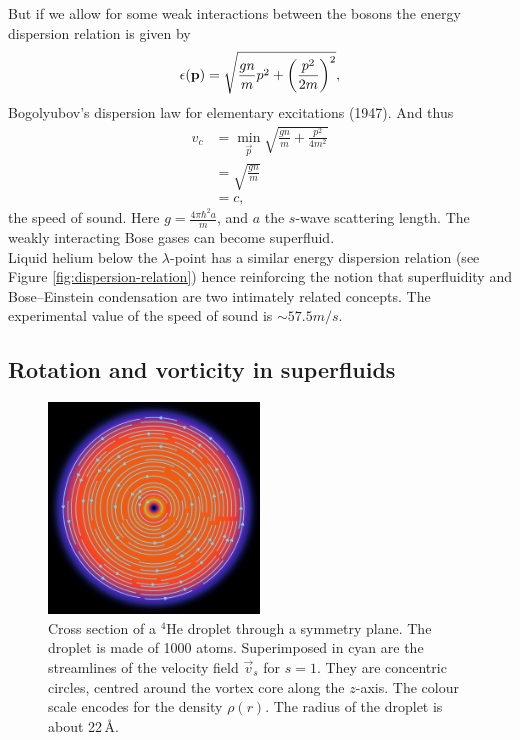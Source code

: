 			But if we allow for some weak interactions between the bosons the energy dispersion relation is given by
			\begin{align}
				\epsilon(\bm{\mathrm{p}})=\sqrt{\frac{gn}{m}p^2+\qty(\frac{p^2}{2m})^2},
			\end{align}
			Bogolyubov's dispersion law for elementary excitations (1947). And thus
			\begin{align}
				v_c &=\min_{\vec{p}}\sqrt{\frac{gn}{m}+\frac{p^2}{4m^2}} \\
					&= \sqrt{\frac{gn}{m}} \\
					&= c,
			\end{align}
			the speed of sound. Here $g=\frac{4\pi\hbar^2a}{m}$, and $a$ the $s$-wave scattering length. The weakly interacting Bose gases can become superfluid.\\			

			Liquid helium below the $\lambda$-point has a similar energy dispersion relation (see Figure \ref{fig:dispersion-relation}) hence reinforcing the notion that superfluidity and Bose--Einstein condensation are two intimately related concepts. The experimental value of the speed of sound is $\sim\!57.5\unit{m/s}$.
			
		\subsection{Rotation and vorticity in superfluids}\label{sec:rot-vort}
			\begin{figure}[t]
				\begin{center}
					\includegraphics[width=0.5\textwidth]{vortex-xy}
					\caption{Cross section of a $^4$He droplet through a symmetry plane. The droplet is made of 1000 atoms. Superimposed in cyan are the streamlines of the velocity field $\vec{v}_s$ for $s=1$. They are concentric circles, centred around the vortex core along the $z$-axis. The colour scale encodes for the density $\rho(r)$. The radius of the droplet is about 22\,\AA.}
					\label{fig:vortex-xy}
				\end{center}
			\end{figure}
		
